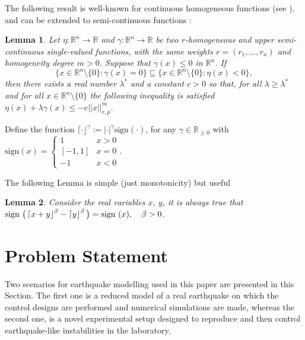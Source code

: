 \documentclass[journal,twoside,web]{ieeecolor}
\newcommand{\Sabs}[1]{\left\lceil #1 \right\rfloor}
\newcommand{\norm}[1]{\left|\left| #1 \right|\right|}
\newtheorem{Lema}{Lemma}
\begin{document}
The following result is well-known for continuous homogeneous functions (see \cite{b:Andrieu-Praly-Astolfi_2008, b:Moreno_2016}), and can be extended to semi-continuous functions \cite{b:Cruz-Zavala-Moreno_2017}:
\begin{Lema}
	Let $\eta: \mathbb{R}^n \rightarrow \mathbb{R}$ and $\gamma: \mathbb{R}^n \rightarrow \mathbb{R}$ be two $r$-homogeneous and upper semi-continuous single-valued functions, with the same weights $r = (r_1, ..., r_n)$ and homogeneity degree $m>0$. Suppose that $\gamma(x) \leq 0$ in $\mathbb{R}^n$. %
	 If
\begin{equation*}
  \{x \in \mathbb{R}^n \setminus \{0\}: \gamma(x) = 0 \} \subseteq \{x \in \mathbb{R}^n \setminus \{0\}: \eta(x) < 0 \},
\end{equation*}
then there exists a real number  $\lambda^*$ and a constant $c > 0$ so that, for all $\lambda \geq  \lambda^*$ and for all $x \in \mathbb{R}^n \setminus\{0\}$ the following inequality is satisfied $\eta(x) + \lambda \gamma(x) \leq -c \norm{x}_{r, p}^m$. 
	\label{lem:Negative I Semi}
\end{Lema}

Define the function $\lceil\cdot\rfloor^{\gamma}:=|\cdot|^{\gamma}\mathrm{sign}(\cdot)$, for any $\gamma\in \mathbb{R}_{\geq 0}$ with $\mathrm{sign}(x)=\left\{\begin{array}{cc}
1 & x>0 \\ 
\left[-1,1\right] & x=0 \\ 
-1 & x<0
\end{array}   \right.$.

The following Lemma is simple (just monotonicity) but useful
\begin{Lema}
	\cite{b:Mercado-Uribe-Moreno} 
	Consider the real variables $x$, $y$, it is always true that $\textup{sign } \big(\Sabs{x + y}^\beta - \Sabs{y}^\beta \big) = \textup{sign }(x), \quad \beta > 0$.
	\label{lem:Holder S}
\end{Lema}

\section{Problem Statement}
\label{sec:Problem}

Two scenarios for earthquake modelling used in this paper are presented in this Section. The first one is a reduced model of a real earthquake on which the control designs are performed and numerical simulations are made, whereas the second one, is a novel experimental setup designed to reproduce and then control earthquake-like instabilities in the laboratory.  
\end{document}
